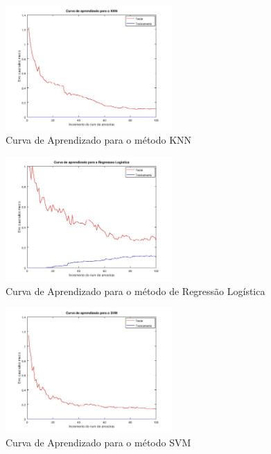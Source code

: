 \documentclass[10pt, conference, compsocconf]{IEEEtran}
\begin{document}
\begin{figure}[!t]
\centering
\includegraphics[width=2.5in]{imgs/KNNcurve.jpg}
\caption{Curva de Aprendizado para o método KNN}
\label{fig:knn_curve}
\end{figure}

\begin{figure}[!t]
\centering
\includegraphics[width=2.5in]{imgs/RLcurve.jpg}
\caption{Curva de Aprendizado para o método de Regressão Logística}
\label{fig:rl_curve}
\end{figure}

\begin{figure}[!t]
\centering
\includegraphics[width=2.5in]{imgs/SVMcurve.jpg}
\caption{Curva de Aprendizado para o método SVM}
\label{fig:svm_curve}
\end{figure}
\end{document}
